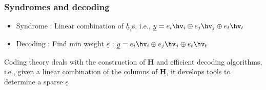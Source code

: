 \begin{frame} \frametitle{Syndromes and decoding}
\vspace*{-0.25in}
\begin{figure}[t]
			\centering
            \resizebox{4.0in}{!}{}
		\end{figure}
\pause
\begin{itemize}
\item Syndrome : Linear combination of $\underline{h}_i$s, i.e., $\underline{y} = e_i \hv_i \oplus e_j \hv_j \oplus e_t \hv_t$
\item Decoding : Find min weight $\underline{e}$ : $\underline{y} = e_i \hv_i \oplus e_j \hv_j \oplus e_t \hv_t$
\end{itemize}
\pause
\begin{block}{\alert{Coding theory deals with the construction of $\mathbf{H}$ and efficient decoding algorithms, i.e., given a linear combination of the columns of $\mathbf{H}$, it develops tools to determine a sparse $\underline{e}$ }}\end{block}
\end{frame}
